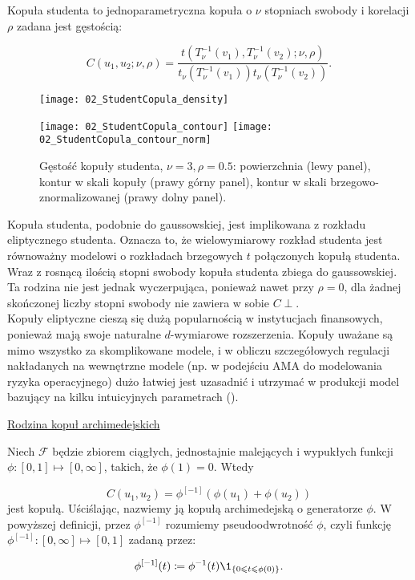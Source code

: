 \begin{df}
	Kopuła studenta to jednoparametryczna kopuła o $\nu$ stopniach swobody i korelacji $\rho$ zadana jest gęstością:
	
	$$ C(u_1, u_2;\nu,\rho) = \frac{t(T_{\nu}^{-1}(v_1), T_{\nu}^{-1}(v_2);\nu,\rho)}{t_{\nu}(T_{\nu}^{-1}(v_1))t_{\nu}(T_{\nu}^{-1}(v_2))}.$$
\end{df}
\begin{figure}[h]
	\centering
	\begin{minipage}{0.5\linewidth}
		\texttt{[image: 02\_StudentCopula\_density]}
	\end{minipage}
	\begin{minipage}{0.45\linewidth}
		\texttt{[image: 02\_StudentCopula\_contour]}
		\texttt{[image: 02\_StudentCopula\_contour\_norm]}
	\end{minipage}
	\caption{Gęstość kopuły studenta, $\nu=3, \rho=0.5$: powierzchnia (lewy panel), kontur w skali kopuły (prawy górny panel), kontur w skali brzegowo-znormalizowanej (prawy dolny panel). \label{fig:student_copula_density}}
\end{figure}
Kopuła studenta, podobnie do gaussowskiej, jest implikowana z rozkładu eliptycznego studenta. Oznacza to, że wielowymiarowy rozkład studenta jest równoważny modelowi o rozkładach brzegowych $t$ połączonych kopułą studenta. Wraz z rosnącą ilością stopni swobody kopuła studenta zbiega do gaussowskiej. Ta rodzina nie jest jednak wyczerpująca, ponieważ nawet przy $\rho=0$, dla żadnej skończonej liczby stopni swobody nie zawiera w sobie $C{\perp}$.\\

Kopuły eliptyczne cieszą się dużą popularnością w instytucjach finansowych, ponieważ mają swoje naturalne $d$-wymiarowe rozszerzenia. Kopuły uważane są mimo wszystko za skomplikowane modele, i w obliczu szczegółowych regulacji nakładanych na wewnętrzne modele (np. w podejściu AMA do modelowania ryzyka operacyjnego) dużo łatwiej jest uzasadnić i utrzymać w produkcji model bazujący na kilku intuicyjnych parametrach (\cite{OpRisk}).

\underline{Rodzina kopuł archimedejskich}\\
\vspace{1cm}
\begin{df}
		Niech $\mathcal{F}$ będzie zbiorem ciągłych, jednostajnie malejących i wypukłych funkcji $\phi \colon [0,1] \mapsto [0, \infty]$, takich, że $\phi(1) = 0$. Wtedy
		
		$$ C(u_1, u_2) = \phi^{[-1]}(\phi(u_1)+\phi(u_2))$$
		jest kopułą. Uściślając, nazwiemy ją kopułą archimedejską o generatorze $\phi$. W powyższej definicji, przez $\phi^{[-1]}$ rozumiemy pseudoodwrotność $\phi$, czyli funkcję $\phi^{[-1]}\colon [0, \infty] \mapsto [0, 1]$ zadaną przez:
		
		$$ \phi^{[-1]}(t) \coloneqq \phi^{-1}(t) \1_{\{0\leqslant t \leqslant \phi(0)\}}. $$
\end{df}

